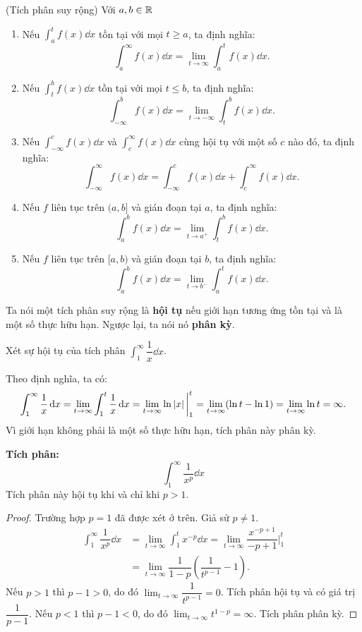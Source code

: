 \begin{definition}(Tích phân suy rộng) Với $a,b \in \mathbb{R}$
    \begin{enumerate}[label=(\alph*)]
        \item Nếu $\int_a^t f(x) \dd x$ tồn tại với mọi $t \ge a$, ta định nghĩa:
        \[ \int_a^\infty f(x) \dd x = \lim_{t \to \infty} \int_a^t f(x) \dd x. \]
        \item Nếu $\int_t^b f(x) \dd x$ tồn tại với mọi $t \le b$, ta định nghĩa:
        \[ \int_{-\infty}^b f(x) \dd x = \lim_{t \to -\infty} \int_t^b f(x) \dd x. \]
        \item Nếu $\int_{-\infty}^c f(x) \dd x$ và $\int_c^\infty f(x) \dd x$ cùng hội tụ với một số $c$ nào đó, ta định nghĩa:
        \[ \int_{-\infty}^\infty f(x) \dd x = \int_{-\infty}^c f(x) \dd x + \int_c^\infty f(x) \dd x. \]
        \item Nếu $f$ liên tục trên $(a, b]$ và gián đoạn tại $a$, ta định nghĩa:
        \[ \int_a^b f(x) \dd x = \lim_{t \to a^+} \int_t^b f(x) \dd x. \]
        \item Nếu $f$ liên tục trên $[a, b)$ và gián đoạn tại $b$, ta định nghĩa:
        \[ \int_a^b f(x) \dd x = \lim_{t \to b^-} \int_a^t f(x) \dd x. \]
    \end{enumerate}
    Ta nói một tích phân suy rộng là \textbf{hội tụ} nếu giới hạn tương ứng tồn tại và là một số thực hữu hạn. Ngược lại, ta nói nó \textbf{phân kỳ}.
\end{definition}

\begin{example}
    Xét sự hội tụ của tích phân $\int_1^\infty \dfrac{1}{x} \dd x$.
\end{example}
\begin{solution}
    Theo định nghĩa, ta có:
    \[
        \int_1^\infty \dfrac{1}{x} \,\mathrm{d} x = \lim_{t \to \infty} \int_1^t \dfrac{1}{x} \,\mathrm{d} x = \lim_{t \to \infty} \ln\left\lvert x \right\rvert \bigg|_1^t = \lim_{t \to \infty} (\ln t - \ln 1) = \lim_{t \to \infty} \ln t = \infty.
    \]
    Vì giới hạn không phải là một số thực hữu hạn, tích phân này phân kỳ.
\end{solution}

\begin{importantbox}
    \textbf{Tích phân:}
    \[
        \int_1^\infty \dfrac{1}{x^p} \dd x
    \]
    Tích phân này hội tụ khi và chỉ khi $p > 1$.
\end{importantbox}
\begin{proof}
    Trường hợp $p=1$ đã được xét ở trên. Giả sử $p \neq 1$.
    \begin{align*}
        \int_1^\infty \dfrac{1}{x^p} \dd x &= \lim_{t \to \infty} \int_1^t x^{-p} \dd x = \lim_{t \to \infty} \dfrac{x^{-p+1}}{-p+1} \bigg|_1^t \\
        &= \lim_{t \to \infty} \dfrac{1}{1-p} \left( \dfrac{1}{t^{p-1}} - 1 \right).
    \end{align*}
    Nếu $p > 1$ thì $p-1 > 0$, do đó $\lim_{t \to \infty} \dfrac{1}{t^{p-1}} = 0$. Tích phân hội tụ và có giá trị $\dfrac{1}{p-1}$.
    Nếu $p < 1$ thì $p-1 < 0$, do đó $\lim_{t \to \infty} t^{1-p} = \infty$. Tích phân phân kỳ.
\end{proof}

